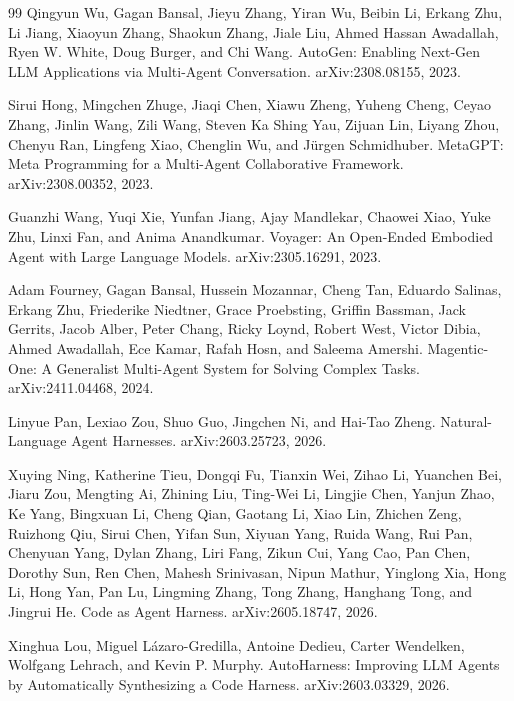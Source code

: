 \documentclass{article}
\begin{document}
\begin{thebibliography}{99}
Qingyun Wu, Gagan Bansal, Jieyu Zhang, Yiran Wu, Beibin Li, Erkang Zhu, Li Jiang, Xiaoyun Zhang, Shaokun Zhang, Jiale Liu, Ahmed Hassan Awadallah, Ryen W. White, Doug Burger, and Chi Wang.
\newblock AutoGen: Enabling Next-Gen LLM Applications via Multi-Agent Conversation.
\newblock arXiv:2308.08155, 2023.

Sirui Hong, Mingchen Zhuge, Jiaqi Chen, Xiawu Zheng, Yuheng Cheng, Ceyao Zhang, Jinlin Wang, Zili Wang, Steven Ka Shing Yau, Zijuan Lin, Liyang Zhou, Chenyu Ran, Lingfeng Xiao, Chenglin Wu, and J\"urgen Schmidhuber.
\newblock MetaGPT: Meta Programming for a Multi-Agent Collaborative Framework.
\newblock arXiv:2308.00352, 2023.

Guanzhi Wang, Yuqi Xie, Yunfan Jiang, Ajay Mandlekar, Chaowei Xiao, Yuke Zhu, Linxi Fan, and Anima Anandkumar.
\newblock Voyager: An Open-Ended Embodied Agent with Large Language Models.
\newblock arXiv:2305.16291, 2023.

Adam Fourney, Gagan Bansal, Hussein Mozannar, Cheng Tan, Eduardo Salinas, Erkang Zhu, Friederike Niedtner, Grace Proebsting, Griffin Bassman, Jack Gerrits, Jacob Alber, Peter Chang, Ricky Loynd, Robert West, Victor Dibia, Ahmed Awadallah, Ece Kamar, Rafah Hosn, and Saleema Amershi.
\newblock Magentic-One: A Generalist Multi-Agent System for Solving Complex Tasks.
\newblock arXiv:2411.04468, 2024.

Linyue Pan, Lexiao Zou, Shuo Guo, Jingchen Ni, and Hai-Tao Zheng.
\newblock Natural-Language Agent Harnesses.
\newblock arXiv:2603.25723, 2026.

Xuying Ning, Katherine Tieu, Dongqi Fu, Tianxin Wei, Zihao Li, Yuanchen Bei, Jiaru Zou, Mengting Ai, Zhining Liu, Ting-Wei Li, Lingjie Chen, Yanjun Zhao, Ke Yang, Bingxuan Li, Cheng Qian, Gaotang Li, Xiao Lin, Zhichen Zeng, Ruizhong Qiu, Sirui Chen, Yifan Sun, Xiyuan Yang, Ruida Wang, Rui Pan, Chenyuan Yang, Dylan Zhang, Liri Fang, Zikun Cui, Yang Cao, Pan Chen, Dorothy Sun, Ren Chen, Mahesh Srinivasan, Nipun Mathur, Yinglong Xia, Hong Li, Hong Yan, Pan Lu, Lingming Zhang, Tong Zhang, Hanghang Tong, and Jingrui He.
\newblock Code as Agent Harness.
\newblock arXiv:2605.18747, 2026.

Xinghua Lou, Miguel L\'azaro-Gredilla, Antoine Dedieu, Carter Wendelken, Wolfgang Lehrach, and Kevin P. Murphy.
\newblock AutoHarness: Improving LLM Agents by Automatically Synthesizing a Code Harness.
\newblock arXiv:2603.03329, 2026.


\end{thebibliography}
\end{document}
